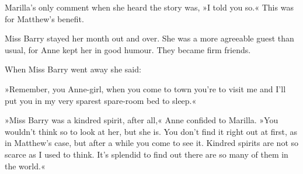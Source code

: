 Marilla’s only comment when she heard the story was, »I told you so.« This was for Matthew’s benefit.

Miss Barry stayed her month out and over. She was a more agreeable guest than usual, for Anne kept her in good humour. They became firm friends.

When Miss Barry went away she said:

»Remember, you Anne-girl, when you come to town you’re to visit me and I’ll put you in my very sparest spare-room bed to sleep.«

»Miss Barry was a kindred spirit, after all,« Anne confided to Marilla. »You wouldn’t think so to look at her, but she is. You don’t find it right out at first, as in Matthew’s case, but after a while you come to see it. Kindred spirits are not so scarce as I used to think. It’s splendid to find out there are so many of them in the world.«